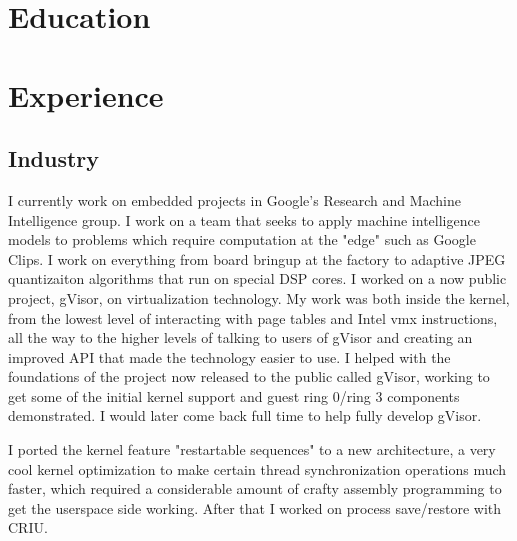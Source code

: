 \documentclass[11pt,a4paper,sans]{moderncv}        %
\begin{document}
\vspace*{-5\baselineskip}
\makecvtitle
\vspace*{-3\baselineskip}
\section{Education}

\section{Experience}

\subsection{Industry}
{I currently work on embedded projects in Google's Research and Machine
Intelligence group. I work on a team that seeks to apply machine intelligence
models to problems which require computation at the "edge" such as Google Clips. I
work on everything from board bringup at the factory to adaptive JPEG
quantizaiton algorithms that run on special DSP cores.}
{I worked on a now public project, gVisor, on virtualization technology. My work
was both inside the kernel, from the lowest level of interacting with page
tables and Intel vmx instructions, all the way to the higher levels of talking
to users of gVisor and creating an improved API that made the technology easier to
use.}
{I helped with the foundations of the project now released to the public called
gVisor, working to get some of the initial kernel support and guest ring 0/ring
3 components demonstrated. I would later come back full time to help fully
develop gVisor.}

 {I ported the kernel feature "restartable
  sequences" to a new architecture, a very cool kernel optimization to make
certain thread synchronization operations much faster, which required a
considerable amount of crafty assembly programming to get the userspace side
working. After that I worked on process save/restore with CRIU.}
\end{document}
